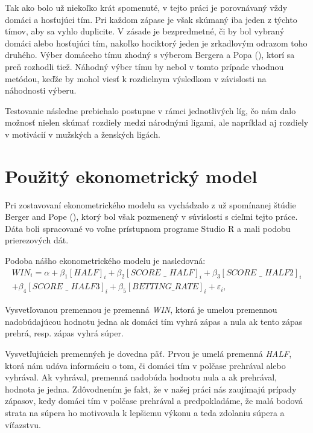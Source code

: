\documentclass[
  digital, %
  oneside, %
  notable,   %
  lof,     %
  lot,     %
]{fithesis3}
\begin{document}
		Tak ako bolo už niekoľko krát spomenuté, v tejto práci je porovnávaný vždy domáci a hosťujúci tím. Pri každom zápase je však skúmaný iba jeden z týchto tímov, aby sa vyhlo duplicite. V zásade je bezpredmetné, či by bol vybraný domáci alebo hosťujúci tím, nakoľko hociktorý jeden je zrkadlovým odrazom toho druhého. Výber domáceho tímu zhodný s výberom Bergera a Popa (\citeyear{berger2011}), ktorí sa preň rozhodli tiež. Náhodný výber tímu by nebol v tomto prípade vhodnou metódou, keďže by mohol viesť k rozdielnym výsledkom v závislosti na náhodnosti výberu.
		
		Testovanie následne prebiehalo postupne v rámci jednotlivých líg, čo nám dalo možnosť nielen skúmať rozdiely medzi národnými ligami, ale napríklad aj rozdiely v motivácií v mužských a ženských ligách.
		
		\section{Použitý ekonometrický model}
		\label{sec:pouzitymodel}
		Pri zostavovaní ekonometrického modelu sa vychádzalo z už spomínanej štúdie Berger and Pope (\citeyear{berger2011}), ktorý bol však pozmenený v súvislosti s cieľmi tejto práce. Dáta boli spracované vo voľne prístupnom programe Studio R a mali podobu prierezových dát.
		
		Podoba nášho ekonometrického modelu je nasledovná:
		\begin{multline}
		WIN_{i} = \alpha + \beta _{1} [\textit{HALF}]_{i} + \beta _{2} [\textit{SCORE~\_~HALF}]_{i} + \beta _{3} [\textit{SCORE~\_~HALF2}]_{i} \\
		+ \beta _{4} [\textit{SCORE~\_~HALF3}]_{i} + \beta _{5} [\textit{BETTING\_RATE}]_{i} + \varepsilon_{i},
		\end{multline}
		
		Vysvetľovanou premennou je premenná \textit{WIN}, ktorá je umelou premennou nadobúdajúcou hodnotu jedna ak domáci tím vyhrá zápas a nula ak tento zápas prehrá, resp. zápas vyhrá súper. 
		
		Vysvetľujúcich premenných je dovedna päť. Prvou je umelá premenná \textit{HALF}, ktorá nám udáva informáciu o tom, či domáci tím v polčase prehrával alebo vyhrával. Ak vyhrával, premenná nadobúda hodnotu nula a ak prehrával, hodnota je jedna. Zdôvodnením je fakt, že v našej práci nás zaujímajú prípady zápasov, kedy domáci tím v polčase prehrával a predpokladáme, že malá bodová strata na súpera ho motivovala k lepšiemu výkonu a teda zdolaniu súpera a víťazstvu. 
		
\end{document}
